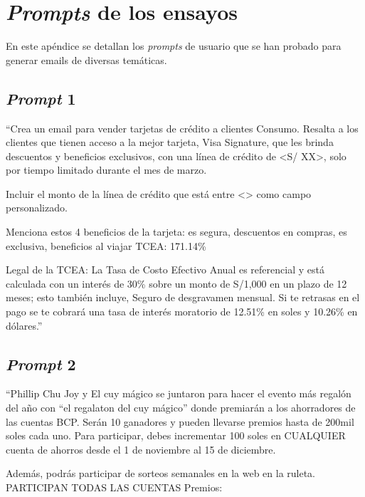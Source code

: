 
\chapter{\textit{Prompts} de los ensayos} %

\label{AppendixB} %

En este apéndice se detallan los \textit{prompts} de usuario que se han probado para generar emails de diversas temáticas.

\section{\textit{Prompt} 1}

``Crea un email para vender tarjetas de crédito a clientes Consumo. Resalta a los clientes que tienen acceso a la mejor tarjeta, Visa Signature, que les brinda descuentos y beneficios exclusivos, con una línea de crédito de <S/ XX>, solo por tiempo limitado durante el mes de marzo. 

Incluir el monto de la línea de crédito que está entre <> como campo personalizado.

Menciona estos 4 beneficios de la tarjeta: es segura, descuentos en compras, es exclusiva, beneficios al viajar
TCEA: 171.14\%

Legal de la TCEA: La Tasa de Costo Efectivo Anual es referencial y está calculada con un interés de 30\% sobre un monto de S/1,000 en un plazo de 12 meses; esto también incluye, Seguro de desgravamen mensual. Si te retrasas en el pago se te cobrará una tasa de interés moratorio de 12.51\% en soles y 10.26\% en dólares.''


\section{\textit{Prompt} 2}


``Phillip Chu Joy y El cuy mágico se juntaron para hacer el evento más regalón del
año con “el regalaton del cuy mágico” donde premiarán a los ahorradores de las
cuentas BCP. Serán 10 ganadores y pueden llevarse premios hasta de 200mil soles
cada uno.
Para participar, debes incrementar 100 soles en CUALQUIER cuenta de ahorros
desde el 1 de noviembre al 15 de diciembre.

Además, podrás participar de sorteos semanales en la web en la ruleta.
PARTICIPAN TODAS LAS CUENTAS
Premios:

